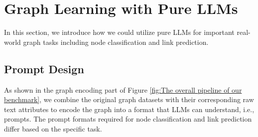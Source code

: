 \section{Graph Learning with Pure LLMs}
In this section, we introduce how we could utilize pure LLMs for important real-world graph tasks including node classification and link prediction.


\subsection{Prompt Design}\label{sec:prompt_design}



As shown in the graph encoding part of Figure \ref{fig:The overall pipeline of our benchmark}, we combine the original graph datasets with their corresponding raw text attributes to encode the graph into a format that LLMs can understand, i.e., prompts. The prompt formats required for node classification and link prediction differ based on the specific task.

